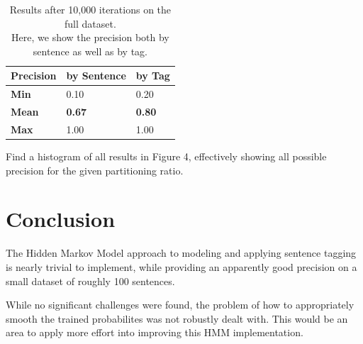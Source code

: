 \documentclass[11pt]{article}
\begin{document}
\begin{table}[h]
\begin{center}
\begin{tabular}{|l|l l|}
\hline \bf Precision  & \bf by Sentence & \bf by Tag \\ \hline
\bf Min  & 0.10 & 0.20 \\
\bf Mean & \bf 0.67 & \bf 0.80 \\
\bf Max  & 1.00 & 1.00 \\
\hline
\end{tabular}
\end{center}
\caption{\label{results} Results after 10,000 iterations on the full dataset. \\
Here, we show the precision both by sentence as well as by tag.}
\end{table}

Find a histogram of all results in Figure 4, effectively showing all possible precision for the
given partitioning ratio.



\section{Conclusion}
The Hidden Markov Model approach to modeling and applying sentence tagging is nearly trivial
to implement, while providing an apparently good precision on a small dataset of roughly
100 sentences.

While no significant challenges were found, the problem of how to appropriately smooth the
trained probabilites was not robustly dealt with.  This would be an area to apply
more effort into improving this HMM implementation.
\end{document}
